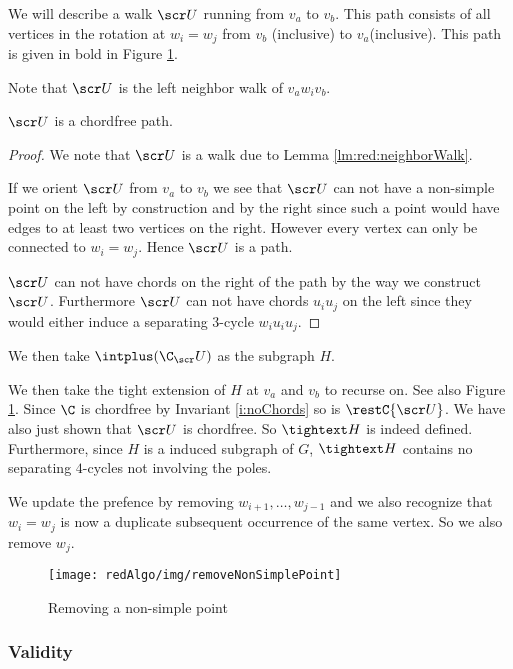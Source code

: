     We will describe a walk $\scr U$ running from $v_a$ to $v_b$. This path consists of all vertices in the rotation at $w_i=w_j$ from $v_b$ (inclusive) to $v_a$(inclusive). This path is given in bold in Figure \ref{fig:removeNonSimplePoint}.

    Note that $\U$ is the left neighbor walk of $v_a w_i v_b$.


    \begin{lemma}
    $\U$ is a chordfree path.
    \end{lemma}
    \begin{proof}
      We note that $\U$ is a walk due to Lemma \ref{lm:red:neighborWalk}.

      If we orient $\U$ from $v_a$ to $v_b$  we see that $\U$ can not have a non-simple point on the left by construction and by the right since such a point would have edges to at least two vertices on the right. However every vertex can only be connected to $w_i=w_j$. Hence $\U$ is a path.

      $\U$ can not have chords on the right of the path by the way we construct $\U$. Furthermore $\scr U$ can not have chords $u_i u_j$ on the left since they would either induce a separating $3$-cycle $w_i u_i u_j$.
    \end{proof}


    We then take $\intplus(\C_\U)$ as the subgraph $H$.

    We then take the tight extension of $H$ at $v_a$ and $v_b$ to recurse on. See also Figure \ref{fig:removeNonSimplePoint}. Since $\C$ is chordfree by Invariant \ref{i:noChords} so is $\restC{\U}$. We have also just shown that $\U$ is chordfree. So $\tightext H$ is indeed defined. Furthermore, since $H$ is a induced subgraph of $G$, $\tightext H$ contains no separating $4$-cycles not involving the poles.


     We update the prefence by removing $w_{i+1}, \ldots, w_{j-1}$ and we also recognize that $w_i = w_j$ is now a duplicate subsequent occurrence of the same vertex. So we also remove $w_j$.

    \begin{figure}[h!]
    \centering
    \texttt{[image: redAlgo/img/removeNonSimplePoint]}

    \caption{Removing a non-simple point
        \label{fig:removeNonSimplePoint}}
    \end{figure}

\subsubsection{Validity}
  \label{ss:validity}

